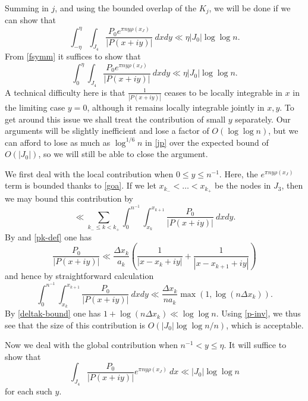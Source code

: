 \documentclass[12pt]{amsart}
\begin{document}
Summing in $j$, and using the bounded overlap of the $K_j$, we will be done if we can show that
$$\int_{-\eta}^{\eta} \int_{J_4} \frac{P_0 e^{\pi n y \rho(x_J)}}{|P(x+iy)|}\ dx dy \ll \eta |J_0| \log\log n.$$
From \eqref{fsymm} it suffices to show that
\begin{equation}\label{jp}
    \int_{0}^{\eta} \int_{J_4} \frac{P_0 e^{\pi n y \rho(x_J)}}{|P(x+iy)|}\ dx dy \ll \eta |J_0| \log\log n.
\end{equation}
A technical difficulty here is that $\frac{1}{|P(x+iy)|}$ ceases to be locally integrable in $x$ in the limiting case $y=0$, although it remains locally integrable jointly in $x,y$.  To get around this issue we shall treat the contribution of small $y$ separately. Our arguments will be slightly inefficient and lose a factor of $O(\log\log n)$, but we can afford to lose as much as $\log^{1/6} n$ in \eqref{jp} over the expected bound of $O(|J_0|)$, so we will still be able to close the argument.

We first deal with the local contribution when $0 \leq y \leq n^{-1}$.  Here, the $e^{\pi ny \rho(x_J)}$ term is bounded thanks to \eqref{goa}. If we let $x_{k_-} < \dots < x_{k_+}$ be the nodes in $J_3$, then we may bound this contribution by
$$\ll \sum_{k_- \leq k < k_+} \int_0^{n^{-1}} \int_{x_k}^{x_{k+1}} \frac{P_0}{|P(x+iy)|}\ dx dy.$$
By  and \eqref{pk-def} one has
\begin{equation}\label{ko} \frac{P_0}{|P(x+iy)|} \ll \frac{\Delta x_k}{a_k} \left( \frac{1}{|x-
x_k+iy|} + \frac{1}{|x-x_{k+1}+iy|} \right)
\end{equation}
and hence by straightforward calculation
$$ \int_0^{n^{-1}} \int_{x_k}^{x_{k+1}} \frac{P_0}{|P(x+iy)|}\ dx dy \ll \frac{\Delta x_k}{na_k}  \max(1, \log(n \Delta x_k)).$$
By \eqref{deltak-bound} one has $1 + \log(n \Delta x_k) \ll \log\log n$.  Using \eqref{p-inv}, we thus see that the size of this contribution is $O( |J_0| \log\log n / n)$, which is acceptable.

Now we deal with the global contribution when $n^{-1} < y \leq \eta$.  It will suffice to show that
$$ \int_{J_4} \frac{P_0}{|P(x+iy)|} e^{\pi n y \rho(x_J)}\ dx \ll |J_0| \log\log n$$
for each such $y$.
\end{document}
